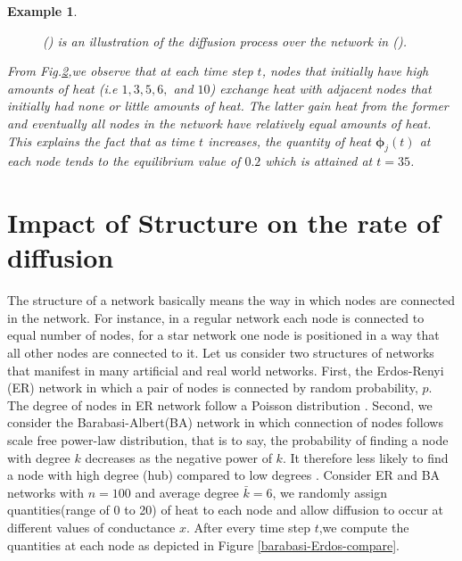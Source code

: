 \documentclass[10pt,a4paper]{article}
\newtheorem{exa}{Example}
\begin{document}
\begin{exa}
\begin{figure}[!h]
\begin{subfigure}[b]{0.45\textwidth}
    	 			\caption{}
    	 			\label{difn-plot}
    	 		\end{subfigure}
    	 		\caption{() is an illustration of the diffusion process over the network in (). }
    	 		\label{graph-plot}
    	 	\end{figure}
     	  From Fig.\ref{graph-plot},we observe that at each time step $t$, nodes that initially have high amounts of heat (i.e $1,3,5,6,$ and $10$) exchange heat with adjacent nodes that initially had none or little amounts of heat. The latter gain heat from the former and eventually all nodes in the network have relatively equal amounts of heat. This explains the fact that as time $t$ increases, the quantity of heat $\boldsymbol{\phi}_j(t)$ at each node tends to the equilibrium value of $0.2$ which is attained at $t=35$. 
    	 \end{exa}
     
     \section{Impact of Structure on the rate of diffusion}
     The structure of a network basically means the way in which nodes are connected in the network. For instance, in a regular network each node is connected to equal number of nodes, for a star network one node is positioned in a way that all other nodes are connected to it.
     Let us consider two structures of networks that manifest in many artificial and real world networks.  First, the Erdos-Renyi (ER) network in which a pair of nodes is connected by random probability, $p$. The degree of nodes in ER network follow a Poisson distribution \cite{erdos1960evolution}. Second, we consider the Barabasi-Albert(BA) network in which connection of nodes follows scale free power-law distribution, that is to say, the probability of finding a node with degree $k$ decreases as the negative power of $k$. It therefore less likely to find a node with high degree (hub) compared to low degrees \cite{barabasi1999emergence, estrada2011structure} . 
     Consider ER and BA networks with $n=100$ and average degree $\bar{k}= 6$, we randomly assign quantities(range of 0 to 20) of heat to each node and allow diffusion to occur at different values of conductance $x$. After every time step $t$,we compute the quantities at each node as depicted in Figure \ref{barabasi-Erdos-compare}.
     
\end{document}
